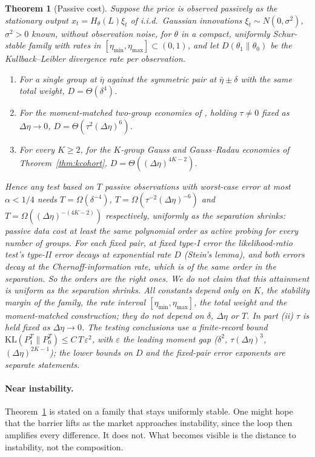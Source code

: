 \documentclass[12pt]{article}
\newtheorem{theorem}{Theorem}[section]
\theoremstyle{definition}
\theoremstyle{remark}
\newcommand{\KL}{\mathrm{KL}}
\begin{document}
\begin{theorem}[Passive cost]\label{prop:passive}
Suppose the price is observed passively as the stationary output $x_t=H_\theta(L)\xi_t$ of i.i.d.\ Gaussian innovations $\xi_t\sim N(0,\sigma^2)$, $\sigma^2>0$ known, without observation noise, for $\theta$ in a compact, uniformly Schur-stable family with rates in $[\eta_{\min},\eta_{\max}]\subset(0,1)$, and let $D(\theta_1\|\theta_0)$ be the Kullback--Leibler divergence rate per observation.
\begin{enumerate}[label=(\roman*)]
\item For a single group at $\bar\eta$ against the symmetric pair at $\bar\eta\pm\delta$ with the same total weight, $D=\Theta(\delta^4)$.
\item For the moment-matched two-group economies of \citet[their Theorem~S11.1]{niroula2026full}, holding $\tau\ne0$ fixed as $\Delta\eta\to0$, $D=\Theta(\tau^2(\Delta\eta)^6)$.
\item For every $K\ge2$, for the $K$-group Gauss and Gauss--Radau economies of Theorem~\ref{thm:kcohort}, $D=\Theta((\Delta\eta)^{4K-2})$.
\end{enumerate}
Hence any test based on $T$ passive observations with worst-case error at most $\alpha<1/4$ needs $T=\Omega(\delta^{-4})$, $T=\Omega(\tau^{-2}(\Delta\eta)^{-6})$ and $T=\Omega((\Delta\eta)^{-(4K-2)})$ respectively, uniformly as the separation shrinks: passive data cost at least the same polynomial order as active probing for every number of groups. For each fixed pair, at fixed type-I error the likelihood-ratio test's type-II error decays at exponential rate $D$ (Stein's lemma), and both errors decay at the Chernoff-information rate, which is of the same order in the separation. So the orders are the right ones. We do not claim that this attainment is uniform as the separation shrinks. All constants depend only on $K$, the stability margin of the family, the rate interval $[\eta_{\min},\eta_{\max}]$, the total weight and the moment-matched construction; they do not depend on $\delta$, $\Delta\eta$ or $T$. In part (ii) $\tau$ is held fixed as $\Delta\eta\to0$. The testing conclusions use a finite-record bound $\KL(P_1^T\|P_0^T)\le C\,T\,\varepsilon^2$, with $\varepsilon$ the leading moment gap ($\delta^2$, $\tau(\Delta\eta)^3$, $(\Delta\eta)^{2K-1}$); the lower bounds on $D$ and the fixed-pair error exponents are separate statements.
\end{theorem}



\paragraph{Near instability.} Theorem~\ref{prop:passive} is stated on a family that stays uniformly stable. One might hope that the barrier lifts as the market approaches instability, since the loop then amplifies every difference. It does not. What becomes visible is the distance to instability, not the composition.
\end{document}
